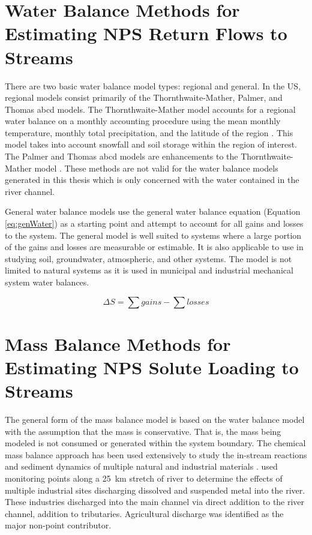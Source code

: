 \section{Water Balance Methods for Estimating NPS Return Flows to Streams}
\label{sec:water balance methods}
There are two basic water balance model types: regional and general.  In the US, regional models consist primarily of the Thornthwaite-Mather, Palmer, and Thomas abcd models.  The Thornthwaite-Mather model accounts for a regional water balance on a monthly accounting procedure using the mean monthly temperature, monthly total precipitation, and the latitude of the region \parencite{Thornthwaite1955}.  This model takes into account snowfall and soil storage within the region of interest.  The Palmer and Thomas abcd models are enhancements to the Thornthwaite-Mather model \parencite{Palmer1965,Thomas1983}.  These methods are not valid for the water balance models generated in this thesis which is only concerned with the water contained in the river channel.

General water balance models use the general water balance equation (Equation \ref{eq:genWater}) as a starting point and attempt to account for all gains and losses to the system.  The general model is well suited to systems where a large portion of the gains and losses are measurable or estimable.  It is also applicable to use in studying soil, groundwater, atmospheric, and other systems.  The model is not limited to natural systems as it is used in municipal and industrial mechanical system water balances.

\begin{equation}
	\label{eq:genWater}
	\Delta S = \sum gains - \sum losses
\end{equation}

\section{Mass Balance Methods for Estimating NPS Solute Loading to Streams}
\label{sec:mass balance methods}
The general form of the mass balance model is based on the water balance model with the assumption that the mass is conservative.  That is, the mass being modeled is not consumed or generated within the system boundary.  The chemical mass balance approach has been used extensively to study the in-stream reactions and sediment dynamics of multiple natural and industrial materials \parencite{Plummer1980,Christophersen1981,Elder1985,Jain1996,Latimer1988,Yuretich1988}. \textcite{Jain1996} used monitoring points along a \SI{25}{\kilo\m} stretch of river to determine the effects of multiple industrial sites discharging dissolved and suspended metal into the river.  These industries discharged into the main channel via direct addition to the river channel, addition to tributaries.  Agricultural discharge was identified as the major non-point contributor.

